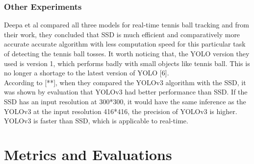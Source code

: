         \subsubsection{Other Experiments}
            Deepa et al compared all three models for real-time tennis ball tracking and from their work, they concluded that SSD is much efficient and comparatively more accurate accurate algorithm with less computation speed for this particular task of detecting the tennis ball tosses. It worth noticing that, the YOLO version they used is version 1, which performs badly with small objects like tennis ball. This is no longer a shortage to the latest version of YOLO [6]. \\ 
            \vspace{3mm}
            According to [**], when they compared the YOLOv3 algorithm with the SSD, it was shown by evaluation that YOLOv3 had better performance than SSD. If the SSD has an input resolution at 300*300, it would have the same inference as the YOLOv3 at the input resolution 416*416, the precision of YOLOv3 is higher. YOLOv3 is faster than SSD, which is applicable to real-time. \\ 

\section{Metrics and Evaluations}

